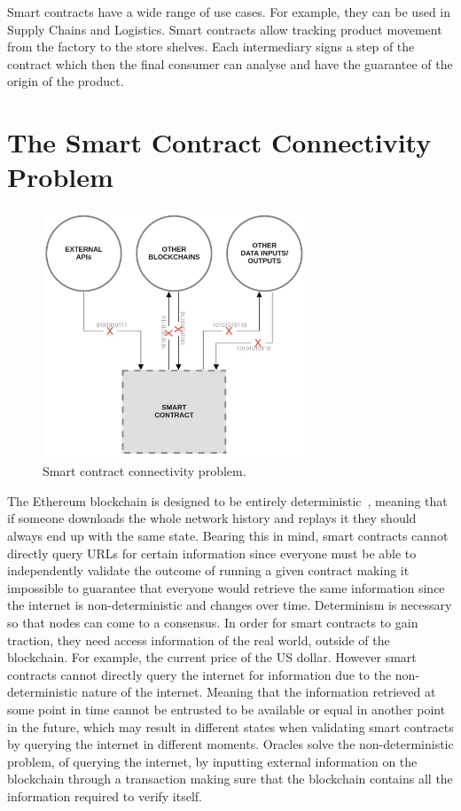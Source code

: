 Smart contracts have a wide range of use cases. For example, they can be used in Supply Chains and Logistics. Smart contracts allow tracking product movement from the factory to the store shelves. Each intermediary signs a step of the contract which then the final consumer can analyse and have the guarantee of the origin of the product.

\section{The Smart Contract Connectivity Problem}

\begin{figure}[t]
  \begin{center}
    \leavevmode
    \includegraphics[width=0.7\textwidth]{figures/sc_connectivity.jpg}
    \caption{Smart contract connectivity problem.}
    \label{fig:/figures/sc_connectivity.jpg}
  \end{center}
\end{figure}

The Ethereum blockchain is designed to be entirely deterministic~\cite{GavinWood2014Ethereum:Ledger}, meaning that if someone downloads the whole network history and replays it they should always end up with the same state. Bearing this in mind, smart contracts cannot directly query URLs for certain information since everyone must be able to independently validate the outcome of running a given contract making it impossible to guarantee that everyone would retrieve the same information since the internet is non-deterministic and changes over time. Determinism is necessary so that nodes can come to a consensus. In order for smart contracts to gain traction, they need access information of the real world, outside of the blockchain. For example, the current price of the US dollar. However smart contracts cannot directly query the internet for information due to the non-deterministic nature of the internet. Meaning that the information retrieved at some point in time cannot be entrusted to be available or equal in another point in the future, which may result in different states when validating smart contracts by querying the internet in different moments. Oracles solve the non-deterministic problem, of querying the internet, by inputting external information on the blockchain through a transaction making sure that the blockchain contains all the information required to verify itself. 


